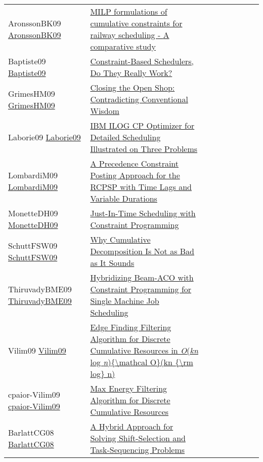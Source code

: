 {\begin{longtable}{p{3cm}p{7cm}lllllll}
AronssonBK09 \href{http://drops.dagstuhl.de/opus/volltexte/2009/2141}{AronssonBK09} &  \href{papers/AronssonBK09.pdf}{{MILP} formulations of cumulative constraints for railway scheduling - {A} comparative study} &  &  &  &  &  &  & \\
Baptiste09 \href{https://doi.org/10.1007/978-3-642-04244-7\_1}{Baptiste09} &  \href{papers/Baptiste09.pdf}{Constraint-Based Schedulers, Do They Really Work?} &  &  &  &  &  &  & \\
GrimesHM09 \href{https://doi.org/10.1007/978-3-642-04244-7\_33}{GrimesHM09} &  \href{papers/GrimesHM09.pdf}{Closing the Open Shop: Contradicting Conventional Wisdom} &  &  &  &  &  &  & \\
Laborie09 \href{https://doi.org/10.1007/978-3-642-01929-6\_12}{Laborie09} &  \href{papers/Laborie09.pdf}{{IBM} {ILOG} {CP} Optimizer for Detailed Scheduling Illustrated on Three Problems} &  &  &  &  &  &  & \\
LombardiM09 \href{https://doi.org/10.1007/978-3-642-04244-7\_45}{LombardiM09} &  \href{papers/LombardiM09.pdf}{A Precedence Constraint Posting Approach for the {RCPSP} with Time Lags and Variable Durations} &  &  &  &  &  &  & \\
MonetteDH09 \href{http://aaai.org/ocs/index.php/ICAPS/ICAPS09/paper/view/712}{MonetteDH09} &  \href{papers/MonetteDH09.pdf}{Just-In-Time Scheduling with Constraint Programming} &  &  &  &  &  &  & \\
SchuttFSW09 \href{https://doi.org/10.1007/978-3-642-04244-7\_58}{SchuttFSW09} &  \href{papers/SchuttFSW09.pdf}{Why Cumulative Decomposition Is Not as Bad as It Sounds} &  &  &  &  &  &  & \\
ThiruvadyBME09 \href{https://doi.org/10.1007/978-3-642-04918-7\_3}{ThiruvadyBME09} &  \href{papers/ThiruvadyBME09.pdf}{Hybridizing Beam-ACO with Constraint Programming for Single Machine Job Scheduling} &  &  &  &  &  &  & \\
Vilim09 \href{https://doi.org/10.1007/978-3-642-04244-7\_62}{Vilim09} &  \href{papers/Vilim09.pdf}{Edge Finding Filtering Algorithm for Discrete Cumulative Resources in \emph{O}(\emph{kn} log \emph{n})\{{\textbackslash}mathcal O\}(kn \{{\textbackslash}rm log\} n)} &  &  &  &  &  &  & \\
cpaior-Vilim09 \href{https://doi.org/10.1007/978-3-642-01929-6\_22}{cpaior-Vilim09} &  \href{papers/cpaior-Vilim09.pdf}{Max Energy Filtering Algorithm for Discrete Cumulative Resources} &  &  &  &  &  &  & \\
BarlattCG08 \href{https://doi.org/10.1007/978-3-540-68155-7\_24}{BarlattCG08} &  \href{papers/BarlattCG08.pdf}{A Hybrid Approach for Solving Shift-Selection and Task-Sequencing Problems} &  &  &  &  &  &  & \\

\end{longtable}}

